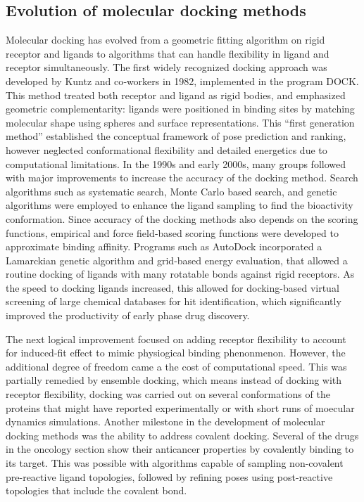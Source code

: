 \subsection{Evolution of molecular docking methods}
Molecular docking has evolved from a geometric fitting algorithm on rigid receptor and ligands to algorithms that can handle flexibility in ligand and receptor simultaneously. The first widely recognized docking approach was developed by Kuntz and co‑workers in 1982, implemented in the program DOCK.\cite{CH1_6} This method treated both receptor and ligand as rigid bodies, and emphasized geometric complementarity: ligands were positioned in binding sites by matching molecular shape using spheres and surface representations. This “first generation method” established the conceptual framework of pose prediction and ranking, however neglected conformational flexibility and detailed energetics due to computational limitations.
In the 1990s and early 2000s, many groups followed with major improvements to increase the accuracy of the docking method. Search algorithms such as systematic search, Monte Carlo based search, and genetic algorithms were employed to enhance the ligand sampling to find the bioactivity conformation. Since accuracy of the docking methods also depends on the scoring functions, empirical and force field‑based scoring functions were developed to approximate binding affinity.\cite{CH1_7, CH1_8} Programs such as AutoDock incorporated a Lamarckian genetic algorithm and grid‑based energy evaluation, that allowed a routine docking of ligands with many rotatable bonds against rigid receptors.\cite{CH1_9} As the speed to docking ligands increased, this allowed for docking-based virtual screening of large chemical databases for hit identification, which significantly improved the productivity of early phase drug discovery. 

The next logical improvement focused on adding receptor flexibility to account for induced-fit effect to mimic physiogical binding phenonmenon. However, the additional degree of freedom came a the cost of computational speed\cite{CH1_8}. This was partially remedied by ensemble docking, which means instead of docking with receptor flexibility, docking was carried out on several conformations of the proteins that might have reported experimentally or with short runs of moecular dynamics simulations. 
Another milestone in the development of molecular docking methods was the ability to address covalent docking. Several of the drugs in the oncology section show their anticancer properties by covalently binding to its target. This was possible with algorithms capable of sampling non-covalent pre-reactive ligand topologies, followed by refining poses using post-reactive topologies that include the covalent bond\cite{CH1_11,CH1_12}.

